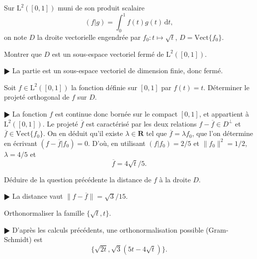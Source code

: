 \documentclass[11pt,a4paper]{article}
\def\R{\mathbf{R}}
\def\L{\mathrm{L}}
\def\Vect{\mathrm{Vect}}
\def\d{\mathrm{d}}
\renewcommand{\bar}{\overline}
\theoremstyle{plain}
\theoremstyle{definition}
\begin{document}
\begin{Exercice}[6 points]
Sur $\L^2([0,1])$ muni de son produit scalaire
\[ (f|g) = \int_0^1 f(t)g(t)\,\d t, \]
on note $D$ la droite
vectorielle engendr\'ee par $f_0 : t \mapsto \sqrt{t}$, $D = \Vect\{f_0\}$.

\begin{Question} Montrer que $D$ est un sous-espace vectoriel ferm\'e de $\L^2([0,1])$.
\end{Question}

\begin{corr} $\RHD$ La partie est un sous-espace vectoriel de dimension finie, donc
ferm\'e.
\end{corr}

\begin{Question} Soit $f \in \L^2([0,1])$ la fonction d\'efinie sur $[0,1]$ par
$f(t)=t$. D\'eterminer le projet\'e orthogonal de $f$ sur $D$.
\end{Question} 

\begin{corr} $\RHD$ La fonction $f$ est continue donc born\'ee sur le compact
$[0,1]$, et appartient \`a $\L^2([0,1])$.
Le projet\'e $\bar{f}$ est caract\'eris\'e par les deux relations $f-\bar{f} \in
D^\perp$ et $\bar{f} \in \Vect\{f_0\}$. On en d\'eduit qu'il existe
$\lambda \in \R$ tel que $\bar{f}=\lambda f_0$, que l'on d\'etermine en \'ecrivant
$(f-\bar{f}|f_0)=0$. D'o\`u, en utilisant $(f|f_0)=2/5$ et $\|f_0\|^2=1/2$,
$\lambda=4/5$ et
\[ \bar{f} = 4\sqrt{t}/5. \]
\end{corr}

\begin{Question} D\'eduire de la question pr\'ec\'edente
la distance de $f$ \`a la droite $D$. 
\end{Question}

\begin{corr} $\RHD$
La distance vaut $\|f-\bar{f}\| = \sqrt{3}/15$.
\end{corr}

\begin{Question} Orthonormaliser la famille $\{\sqrt{t},t\}$.
\end{Question}

\begin{corr} $\RHD$
D'apr\`es les calculs pr\'ec\'edents, une orthonormalisation possible (Gram-Schmidt)
est
\[ \{\sqrt{2t},\sqrt{3}(5t-4\sqrt{t})\}. \]
\end{corr}

\end{Exercice} \vspace*{1em}
\end{document}
